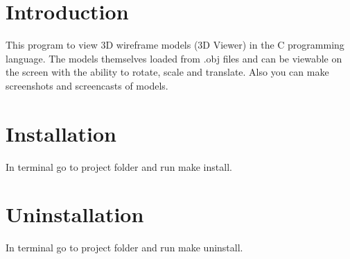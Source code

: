 \documentclass{article}
\begin{document}
\maketitle

\section{Introduction}

This program to view 3D wireframe models (3D Viewer) in the C programming language. The models themselves loaded from .obj files and can be viewable on the screen with the ability to rotate, scale and translate. Also you can make screenshots and screencasts of models.

\section{Installation}

In terminal go to project folder and run make install.

\section{Uninstallation}

In terminal go to project folder and run make uninstall.
\end{document}
